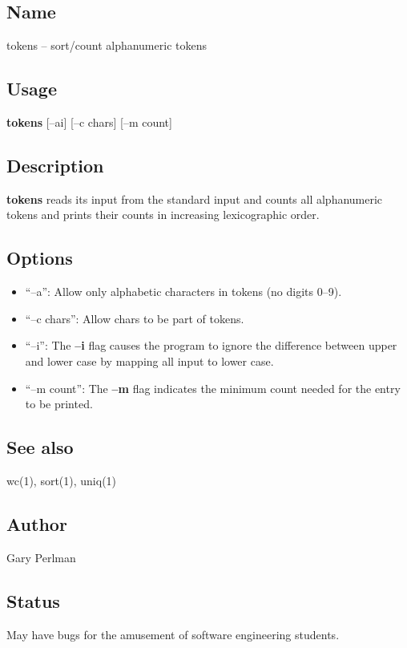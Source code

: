 
\subsection*{Name}

tokens -- sort/count alphanumeric tokens

\subsection*{Usage}
{\bf tokens } [--ai] [--c chars] [--m count]


\subsection*{Description}
{\bf tokens} reads its input from the standard input and counts all
alphanumeric tokens and prints their counts in increasing
lexicographic order. 

\subsection*{Options}

\begin{itemize}

\item ``--a'': Allow only alphabetic characters in tokens (no digits 0--9).

\item ``--c chars'': Allow chars to be part of tokens.

\item ``--i'':
The {\bf --i} flag causes the program to ignore the difference between
upper and lower case by mapping all input to lower case. 

\item ``--m count'':
The {\bf --m}  flag indicates the minimum count needed for the entry to
be printed. 

\end{itemize}

\subsection*{See also}

wc(1), sort(1), uniq(1)

\subsection*{Author}
Gary Perlman 

\subsection*{Status}
May have bugs for the amusement of software engineering students.
